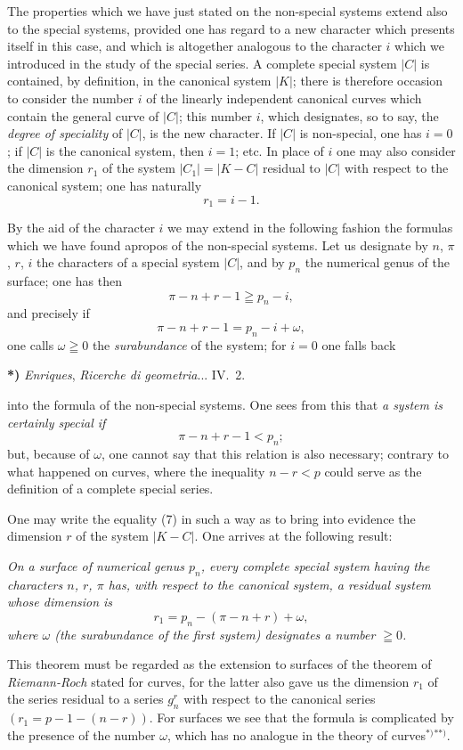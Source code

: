 \documentclass{article}
\begin{document}
The properties which we have just stated on the non-special systems extend also to the special systems, provided one has regard to a new character which presents itself in this case, and which is altogether analogous to the character $i$ which we introduced in the study of the special series. A complete special system $|C|$ is contained, by definition, in the canonical system $|K|$; there is therefore occasion to consider the number $i$ of the linearly independent canonical curves which contain the general curve of $|C|$; this number $i$, which designates, so to say, the \emph{degree of speciality} of $|C|$, is the new character. If $|C|$ is non-special, one has $i = 0$; if $|C|$ is the canonical system, then $i = 1$; etc. In place of $i$ one may also consider the dimension $r_{1}$ of the system $|C_{1}| = |K-C|$ residual to $|C|$ with respect to the canonical system; one has naturally
\[ r_{1} = i - 1. \]

By the aid of the character $i$ we may extend in the following fashion the formulas which we have found apropos of the non-special systems. Let us designate by $n$, $\pi$, $r$, $i$ the characters of a special system $|C|$, and by $p_{n}$ the numerical genus of the surface; one has then
\[ \pi - n + r - 1 \geqq p_{n} - i, \]
and precisely if
\[ \pi - n + r - 1 = p_{n} - i + \omega, \tag{7} \]
one calls $\omega \geqq 0$ the \emph{surabundance} of the system; for $i = 0$ one falls back

\textbf{*)} \emph{Enriques}, \emph{Ricerche di geometria}... IV.\ 2.

into the formula of the non-special systems. One sees from this that \emph{a system is certainly special if}
\[ \pi - n + r - 1 < p_{n}; \]
but, because of $\omega$, one cannot say that this relation is also necessary; contrary to what happened on curves, where the inequality $n - r < p$ could serve as the definition of a complete special series.

One may write the equality (7) in such a way as to bring into evidence the dimension $r$ of the system $|K-C|$. One arrives at the following result:

\emph{On a surface of numerical genus $p_{n}$, every complete special system having the characters $n$, $r$, $\pi$ has, with respect to the canonical system, a residual system whose dimension is}
\[ r_{1} = p_{n} - (\pi-n+r) + \omega, \tag{8} \]
\emph{where $\omega$ (the surabundance of the first system) designates a number $\geqq 0$.}

This theorem must be regarded as the extension to surfaces of the theorem of \emph{Riemann-Roch} stated for curves, for the latter also gave us the dimension $r_{1}$ of the series residual to a series $g_{n}^{r}$ with respect to the canonical series $(r_{1} = p - 1 - (n-r))$. For surfaces we see that the formula is complicated by the presence of the number $\omega$, which has no analogue in the theory of curves${}^{*)}$${}^{**)}$.
\end{document}
